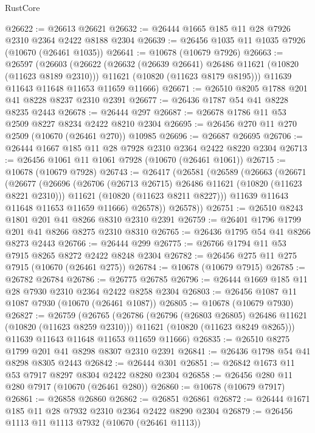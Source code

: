 \begin{lexlean}{RustCore}
\begin{coremodule}
@26622 := @26613 @26621
@26632 := @26444 @1665 @185 @11 @28 @7926 @2310 @2364 @2422 @8188 @2304
@26639 := @26456 @1035 @11 @1035 @7926 (@10670 (@26461 @1035))
@26641 := @10678 (@10679 @7926)
@26663 := @26597
    (@26603
      (@26622
        (@26632 (@26639 @26641) @26486 @11621 (@10820 (@11623 @8189 @2310)))
        @11621
        (@10820 (@11623 @8179 @8195)))
      @11639
      @11643
      @11648
      @11653
      @11659
      @11666)
@26671 := @26510 @8205 @1788 @201 @41 @8228 @8237 @2310 @2391
@26677 := @26436 @1787 @54 @41 @8228 @8235 @2443
@26678 := @26444 @297
@26687 := @26678 @1786 @11 @53 @2509 @8227 @8234 @2422 @8210 @2304
@26695 := @26456 @270 @11 @270 @2509 (@10670 (@26461 @270)) @10985
@26696 := @26687 @26695
@26706 := @26444 @1667 @185 @11 @28 @7928 @2310 @2364 @2422 @8220 @2304
@26713 := @26456 @1061 @11 @1061 @7928 (@10670 (@26461 @1061))
@26715 := @10678 (@10679 @7928)
@26743 := @26417
    (@26581
      (@26589
        (@26663
          (@26671
            (@26677
              (@26696
                (@26706 (@26713 @26715) @26486 @11621 (@10820 (@11623 @8221 @2310)))
                @11621
                (@10820 (@11623 @8211 @8227)))
              @11639
              @11643
              @11648
              @11653
              @11659
              @11666)
            @26578))
        @26578))
@26751 := @26510 @8243 @1801 @201 @41 @8266 @8310 @2310 @2391
@26759 := @26401 @1796 @1799 @201 @41 @8266 @8275 @2310 @8310
@26765 := @26436 @1795 @54 @41 @8266 @8273 @2443
@26766 := @26444 @299
@26775 := @26766 @1794 @11 @53 @7915 @8265 @8272 @2422 @8248 @2304
@26782 := @26456 @275 @11 @275 @7915 (@10670 (@26461 @275))
@26784 := @10678 (@10679 @7915)
@26785 := @26782 @26784
@26786 := @26775 @26785
@26796 := @26444 @1669 @185 @11 @28 @7930 @2310 @2364 @2422 @8258 @2304
@26803 := @26456 @1087 @11 @1087 @7930 (@10670 (@26461 @1087))
@26805 := @10678 (@10679 @7930)
@26827 := @26759
    (@26765
      (@26786
        (@26796 (@26803 @26805) @26486 @11621 (@10820 (@11623 @8259 @2310)))
        @11621
        (@10820 (@11623 @8249 @8265)))
      @11639
      @11643
      @11648
      @11653
      @11659
      @11666)
@26835 := @26510 @8275 @1799 @201 @41 @8298 @8307 @2310 @2391
@26841 := @26436 @1798 @54 @41 @8298 @8305 @2443
@26842 := @26444 @301
@26851 := @26842 @1673 @11 @53 @7917 @8297 @8304 @2422 @8280 @2304
@26858 := @26456 @280 @11 @280 @7917 (@10670 (@26461 @280))
@26860 := @10678 (@10679 @7917)
@26861 := @26858 @26860
@26862 := @26851 @26861
@26872 := @26444 @1671 @185 @11 @28 @7932 @2310 @2364 @2422 @8290 @2304
@26879 := @26456 @1113 @11 @1113 @7932 (@10670 (@26461 @1113))

\end{coremodule}
\end{lexlean}
